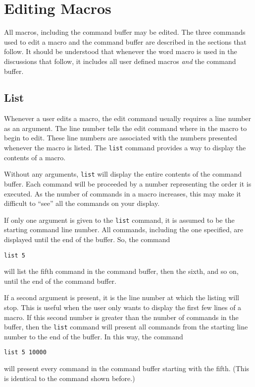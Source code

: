 \section		{Editing Macros}

All macros, including the command buffer
may be edited.
The three commands used to edit a macro and the command buffer are
described in the sections that follow.
It should be understood that whenever the word macro is used in the
discussions that follow, it includes all user defined macros {\em and}
the command buffer.

\subsection*		{List}

Whenever a user edits a macro,
the edit command usually requires a line number as an argument.
The line number tells the edit command where in the macro to begin to edit.
These line numbers are associated with the numbers presented
whenever the macro is listed.
The {\tt list} command provides a way to display the contents of a macro.

Without any arguments, {\tt list} will display the entire contents of
the command buffer.
Each command will be proceeded by a number representing the order it
is executed.
As the number of commands in a macro increases,
this may make it difficult to ``see'' all
the commands on your display.

If only one argument is given to the {\tt list} command,
it is assumed to be the starting command line number.
All commands, including the one specified, are displayed until the end
of the buffer.
So, the command
\begin{wiplist}%
  \item [\wipp] {\tt list 5}
\end{wiplist}
will list the fifth command in the command buffer, then the sixth, and
so on, until the end of the command buffer.

If a second argument is present, it is the line number at which the listing
will stop.
This is useful when the user only wants to display the first few lines
of a macro.
If this second number is greater than the number of commands in the buffer,
then the {\tt list} command will present all commands from the starting
line number to the end of the buffer.
In this way, the command
\begin{wiplist}%
  \item [\wipp] {\tt list 5 10000}
\end{wiplist}
will present every command in the command buffer starting with the fifth.
(This is identical to the command shown before.)

